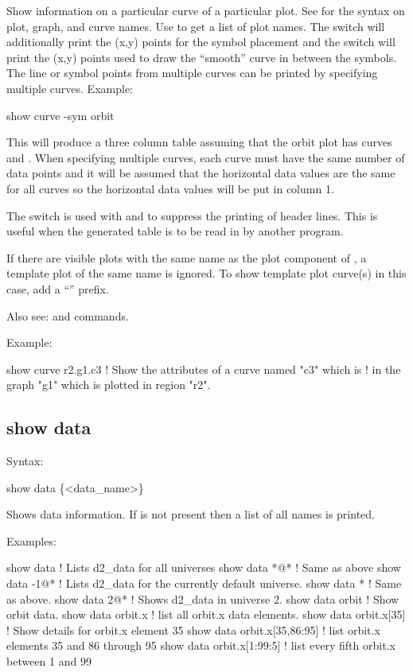 {{{{{{{{Show information on a particular curve of a particular plot. See  for the
syntax on plot, graph, and curve names.  Use  to get a list of plot
names. The  switch will additionally print the (x,y) points for the symbol
placement and the  switch will print the (x,y) points used to draw the
``smooth'' curve in between the symbols. The line or symbol points from multiple curves
can be printed by specifying multiple curves. Example:
\begin{example}
  show curve -sym orbit
\end{example}
This will produce a three column table assuming that the orbit plot has curves
 and . When specifying multiple curves, each curve must have
the same number of data points and it will be assumed that the horizontal data values are
the same for all curves so the horizontal data values will be put in column 1.

The  switch is used with  and  to suppress the
printing of header lines. This is useful when the generated table is to be read in by
another program.

If there are visible plots with the same name as the plot component of , a template plot
of the same name is ignored. To show template plot curve(s) in this case, add a ``'' prefix.

Also see:  and  commands.

Example:
\begin{example}
  show curve r2.g1.c3     ! Show the attributes of a curve named "c3" which is 
                          !   in the graph "g1" which is plotted in region "r2".
\end{example}


\subsection{show data}
\label{s:show.data}

Syntax:
\begin{example}
  show data \{<data_name>\}
\end{example}

Shows data information. If  is not present then a list of all 
names is printed.

Examples:
\begin{example}
  show data                   ! Lists d2_data for all universes
  show data *@*               ! Same as above
  show data -1@*              ! Lists d2_data for the currently default universe.
  show data *                 ! Same as above.
  show data 2@*               ! Shows d2_data in universe 2.
  show data orbit             ! Show orbit data.
  show data orbit.x           ! list all orbit.x data elements.
  show data orbit.x[35]       ! Show details for orbit.x element 35
  show data orbit.x[35,86:95] ! list orbit.x elements 35 and 86 through 95
  show data orbit.x[1:99:5]   ! list every fifth orbit.x between 1 and 99  
\end{example}

}}}}}}}}
